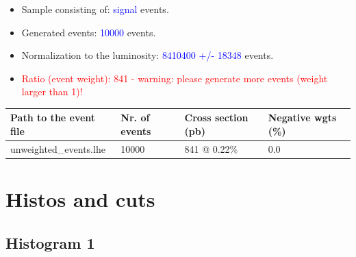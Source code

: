 \documentclass[a4paper, 10pt]{article}
\begin{document}
\begin{itemize}
  \item Sample consisting of: \textcolor{blue}{signal}  events.
   \item Generated events: \textcolor{blue}{10000 }  events.
   \item Normalization to the luminosity: \textcolor{blue}{8410400}\textcolor{blue}{ +/\-- }\textcolor{blue}{18348 }  events.
   \item\textcolor{red}{Ratio (event weight): }\textcolor{red}{841 }\textcolor{red}{ - warning: please generate more events (weight larger than 1)!}
\textcolor{red}{}
\end{itemize}
\begin{table}[H]
  \begin{center}
    \begin{tabular}{|m{55.0mm}|m{25.0mm}|m{30.0mm}|m{30.0mm}|}
      \hline
      {\cellcolor{yellow}         Path to the event file}& {\cellcolor{yellow}         Nr. of events}& {\cellcolor{yellow}         Cross section (pb)}& {\cellcolor{yellow}         Negative wgts (\%)}\\
      \hline
      {\cellcolor{white}          unweighted\_events.lhe}& {\cellcolor{white}          10000}& {\cellcolor{white}          841 @ 0.22\%}& {\cellcolor{white}          0.0}\\
\hline
    \end{tabular}
  \end{center}
\end{table}

\newpage
\section{ Histos and cuts}

\subsection{ Histogram 1}
\end{document}

